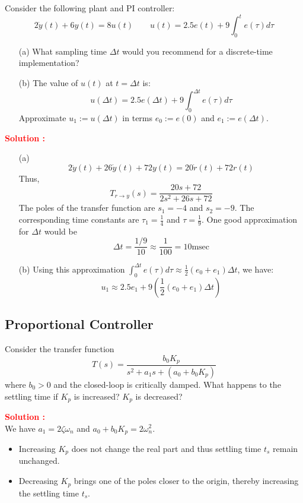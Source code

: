 \documentclass[12pt]{article}
\begin{document}
Consider the following plant and PI controller:
\[2\dot{y}(t) + 6y(t) = 8u(t) \quad \quad  u(t) = 2.5e(t) + 9 \int_0^t e(\tau) d\tau\]
\begin{itemize}
    \item[(a)] What sampling time \(\Delta t\) would you recommend for a discrete-time implementation?
    \item[(b)] The value of \(u(t)\) at \(t = \Delta t\) is:
    \[u(\Delta t) = 2.5e(\Delta t) + 9 \int_0^{\Delta t} e(\tau) d\tau \]
    Approximate \(u_1:= u(\Delta t)\) in terms \(e_0 := e(0)\) and \(e_1:=e(\Delta t)\).

\end{itemize}
\textbf{\textcolor{red}{Solution :}}
\begin{itemize}
    \item[(a)]
    \[2\ddot{y}(t) + 26 \dot{y}(t) + 72 y(t) = 20 \dot{r}(t) + 72 r(t)\]
    Thus,
    \[T_{r \rightarrow y}(s) = \frac{20s+72}{2s^2 + 26s + 72}\]
    The poles of the transfer function are \(s_1 = -4\) and \(s_2 = -9\). The corresponding time constants are \(\tau_1 = \frac{1}{4}\) and \(\tau  = \frac{1}{9}\).
    One good approximation for \(\Delta t\) would be
    \[\Delta t = \frac{1/9}{10} \approx \frac{1}{100} = 10 \text{msec}\]
    \item[(b)] Using this approximation \(\int_0^{\Delta t} e(\tau) d\tau \approx \frac{1}{2}(e_0 + e_1) \Delta t\), we have:
    \[u_1 \approx  2.5 e_1 + 9(\frac{1}{2}(e_0 + e_1) \Delta t)\]
\end{itemize}
\clearpage

\subsection{Proportional Controller}

Consider the transfer function
\begin{equation}
    T(s) = \frac{b_0 K_p}{s^2+a_1s+(a_0 + b_0 K_p)}
\end{equation}
where \(b_0 > 0\) and the closed-loop is critically damped. What happens to the settling time if \(K_p\) is increased? \(K_p\) is decreased?

\textbf{\textcolor{red}{Solution :}} \\
We have \(a_1 = 2\zeta \omega_n\) and \(a_0 + b_0 K_p = 2  \omega_n^2\). \\
\begin{itemize}
    \item Increasing \(K_p\) does not change the real part and thus settling time \(t_s\) remain unchanged.
    \item Decreasing \(K_p\) brings one of the poles closer to the origin, thereby increasing the settling time \(t_s\).
\end{itemize}
\clearpage
\end{document}
